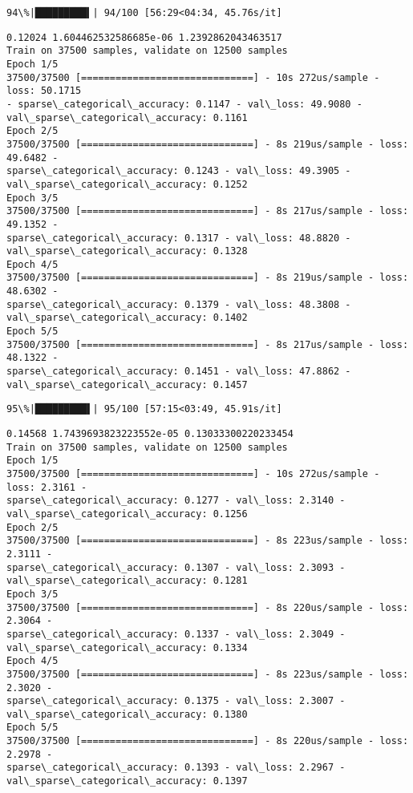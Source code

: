 \documentclass[11pt]{article}
\begin{document}
    \begin{Verbatim}[commandchars=\\\{\}]
 94\%|█████████▍| 94/100 [56:29<04:34, 45.76s/it]
    \end{Verbatim}

    \begin{Verbatim}[commandchars=\\\{\}]
0.12024 1.604462532586685e-06 1.2392862043463517
Train on 37500 samples, validate on 12500 samples
Epoch 1/5
37500/37500 [==============================] - 10s 272us/sample - loss: 50.1715
- sparse\_categorical\_accuracy: 0.1147 - val\_loss: 49.9080 -
val\_sparse\_categorical\_accuracy: 0.1161
Epoch 2/5
37500/37500 [==============================] - 8s 219us/sample - loss: 49.6482 -
sparse\_categorical\_accuracy: 0.1243 - val\_loss: 49.3905 -
val\_sparse\_categorical\_accuracy: 0.1252
Epoch 3/5
37500/37500 [==============================] - 8s 217us/sample - loss: 49.1352 -
sparse\_categorical\_accuracy: 0.1317 - val\_loss: 48.8820 -
val\_sparse\_categorical\_accuracy: 0.1328
Epoch 4/5
37500/37500 [==============================] - 8s 219us/sample - loss: 48.6302 -
sparse\_categorical\_accuracy: 0.1379 - val\_loss: 48.3808 -
val\_sparse\_categorical\_accuracy: 0.1402
Epoch 5/5
37500/37500 [==============================] - 8s 217us/sample - loss: 48.1322 -
sparse\_categorical\_accuracy: 0.1451 - val\_loss: 47.8862 -
val\_sparse\_categorical\_accuracy: 0.1457
    \end{Verbatim}

    \begin{Verbatim}[commandchars=\\\{\}]
 95\%|█████████▌| 95/100 [57:15<03:49, 45.91s/it]
    \end{Verbatim}

    \begin{Verbatim}[commandchars=\\\{\}]
0.14568 1.7439693823223552e-05 0.13033300220233454
Train on 37500 samples, validate on 12500 samples
Epoch 1/5
37500/37500 [==============================] - 10s 272us/sample - loss: 2.3161 -
sparse\_categorical\_accuracy: 0.1277 - val\_loss: 2.3140 -
val\_sparse\_categorical\_accuracy: 0.1256
Epoch 2/5
37500/37500 [==============================] - 8s 223us/sample - loss: 2.3111 -
sparse\_categorical\_accuracy: 0.1307 - val\_loss: 2.3093 -
val\_sparse\_categorical\_accuracy: 0.1281
Epoch 3/5
37500/37500 [==============================] - 8s 220us/sample - loss: 2.3064 -
sparse\_categorical\_accuracy: 0.1337 - val\_loss: 2.3049 -
val\_sparse\_categorical\_accuracy: 0.1334
Epoch 4/5
37500/37500 [==============================] - 8s 223us/sample - loss: 2.3020 -
sparse\_categorical\_accuracy: 0.1375 - val\_loss: 2.3007 -
val\_sparse\_categorical\_accuracy: 0.1380
Epoch 5/5
37500/37500 [==============================] - 8s 220us/sample - loss: 2.2978 -
sparse\_categorical\_accuracy: 0.1393 - val\_loss: 2.2967 -
val\_sparse\_categorical\_accuracy: 0.1397
    \end{Verbatim}
\end{document}
